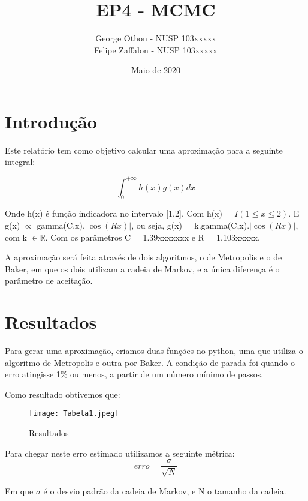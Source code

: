\documentclass{article}
\title{EP4 - MCMC}
\author{George Othon - NUSP 103xxxxx 
        \\ Felipe Zaffalon - NUSP 103xxxxx}
\date{Maio de 2020}
\begin{document}
\maketitle

\section{Introdução}

Este relatório tem como objetivo calcular uma aproximação para a seguinte integral:

\hfill

$$ \int_0 ^ {+\infty} h(x) g(x) dx $$

\hfill

\par Onde h(x) é função indicadora no intervalo [1,2]. Com h(x) = $ I( 1 \leq x \leq 2 )$. E g(x) $ \propto$ gamma(C,x).$\left|\cos (Rx)\right|$, ou seja, g(x) = k.gamma(C,x).$\left|\cos (Rx)\right|$, com k $\in \mathbb{R}$. Com os parâmetros C = 1.39xxxxxxx e R = 1.103xxxxx.

\par A aproximação será feita através de dois algoritmos, o de Metropolis e o de Baker, em que os dois utilizam a cadeia de Markov, e a única diferença é o parâmetro de aceitação.

\section{Resultados}
Para gerar uma aproximação, criamos duas funções no python, uma que utiliza o algoritmo de Metropolis e outra por Baker. A condição de parada foi quando o erro atingisse 1\% ou menos, a partir de um número mínimo de passos.

\par Como resultado obtivemos que:

\hfill

\begin{figure}[!htb]
    \centering
    \texttt{[image: Tabela1.jpeg]}
    \caption{Resultados}
    \label{fig:my_label}
\end{figure}

\par Para chegar neste erro estimado utilizamos a seguinte métrica:
$$ erro = \frac{\sigma}{\sqrt{N}} $$


\hfill

\par Em que $\sigma$ é o desvio padrão da cadeia de Markov, e N o tamanho da cadeia.
\end{document}
